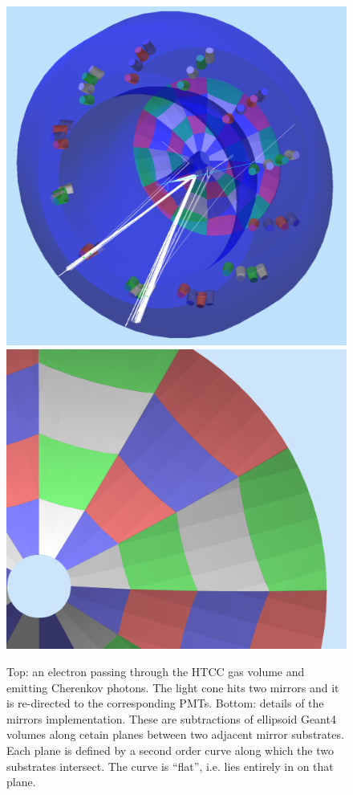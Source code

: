 \begin{figure}
	\centering
	\includegraphics[width=0.95\columnwidth,keepaspectratio]{img/htccGeometry.png}
	\includegraphics[width=0.95\columnwidth,keepaspectratio]{img/htccDetail.png}
	\caption{Top: an electron passing through the HTCC gas volume and emitting Cherenkov photons. The light cone
            hits two mirrors and it is re-directed to the corresponding PMTs.
            Bottom: details of the mirrors implementation. These are subtractions of ellipsoid Geant4 volumes along
            cetain planes between two adjacent mirror substrates. Each plane is defined by a second order
            curve along which the two substrates intersect. The curve is ``flat'', i.e. lies entirely in on that plane.}
	\label{fig:htccGeometry}
\end{figure}


